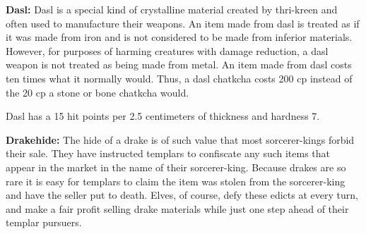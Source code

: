 




\textbf{Dasl:} Dasl is a special kind of crystalline material created by thri-kreen and often used to manufacture their weapons. An item made from dasl is treated as if it was made from iron and is not considered to be made from inferior materials. However, for purposes of harming creatures with damage reduction, a dasl weapon is not treated as being made from metal. An item made from dasl costs ten times what it normally would. Thus, a dasl chatkcha costs 200 cp instead of the 20 cp a stone or bone chatkcha would.

Dasl has a 15 hit points per 2.5 centimeters of thickness and hardness 7.

\textbf{Drakehide:} The hide of a drake is of such value that most sorcerer-kings forbid their sale. They have instructed templars to confiscate any such items that appear in the market in the name of their sorcerer-king. Because drakes are so rare it is easy for templars to claim the item was stolen from the sorcerer-king and have the seller put to death. Elves, of course, defy these edicts at every turn, and make a fair profit selling drake materials while just one step ahead of their templar pursuers.


